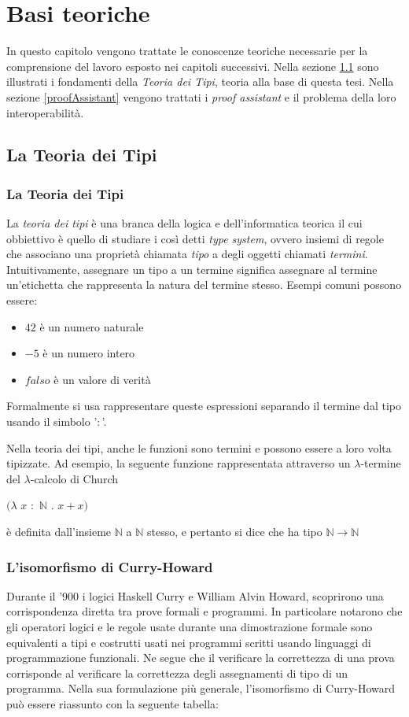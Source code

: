 \documentclass[12pt,a4paper]{report}
\begin{document}
\chapter{Basi teoriche}
In questo capitolo vengono trattate le conoscenze teoriche necessarie per la
comprensione del lavoro esposto nei capitoli successivi. Nella sezione \ref{teoriaDeiTipi}
sono illustrati i fondamenti della \textit{Teoria dei Tipi}, teoria alla base 
di questa tesi. Nella sezione \ref{proofAssistant} vengono trattati i \textit{proof 
assistant} e il problema della loro interoperabilità.

\section{La Teoria dei Tipi} \label{teoriaDeiTipi}
\subsection{La Teoria dei Tipi}
La \textit{teoria dei tipi} è una branca della logica e dell'informatica teorica il
cui obbiettivo è quello di studiare i così detti \textit{type system}, ovvero
insiemi di regole che associano una proprietà chiamata \textit{tipo} a degli oggetti
chiamati \textit{termini}. Intuitivamente, assegnare un tipo a un termine significa
assegnare al termine un'etichetta che rappresenta la natura del termine stesso.
Esempi comuni possono essere: 
\begin{itemize}
  \item $42$ è un numero naturale 
  \item $-5$ è un numero intero
  \item $falso$ è un valore di verità 
\end{itemize}

Formalmente si usa rappresentare queste espressioni separando il termine dal tipo usando
il simbolo '$:$'. 

Nella teoria dei tipi, anche le funzioni sono termini e possono essere
a loro volta tipizzate. Ad esempio, la seguente funzione rappresentata attraverso un $\lambda$-termine
del $\lambda$-calcolo di Church 
\begin{center}
  $(\lambda$ $x$ $:$ $\mathbb{N}$ $.$ $x + x)$
\end{center}

è definita dall'insieme $\mathbb{N}$ a $\mathbb{N}$ stesso, e pertanto si dice che ha tipo $\mathbb{N} \rightarrow \mathbb{N}$

\subsection{L'isomorfismo di Curry-Howard}
Durante il '900 i logici Haskell Curry e William Alvin Howard, scoprirono una
corrispondenza diretta tra prove formali e programmi. In particolare notarono
che gli operatori logici e le regole usate durante una dimostrazione formale
sono equivalenti a tipi e costrutti usati nei programmi scritti usando linguaggi
di programmazione funzionali. Ne segue che il verificare la correttezza di una
prova corrisponde al verificare la correttezza degli assegnamenti di tipo di un
programma. Nella sua formulazione più generale, l'isomorfismo di Curry-Howard
può essere riassunto con la seguente tabella:
\end{document}
